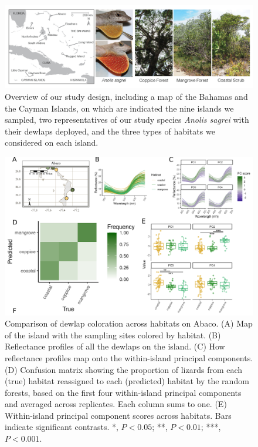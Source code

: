 \begin{figure}[H]
	\centering
	\includegraphics[width=\textwidth]{figures/overview.png}
	\caption{Overview of our study design, including a map of the Bahamas and the Cayman Islands, on which are indicated the nine islands we sampled, two representatives of our study species \textit{Anolis sagrei} with their dewlaps deployed, and the three types of habitats we considered on each island.}
	\label{fig:overview}
\end{figure}

\pagebreak

\begin{figure}[H]
	\centering
	\includegraphics[width=\textwidth]{figures/Abaco.png}
	\caption{Comparison of dewlap coloration across habitats on Abaco. (A) Map of the island with the sampling sites colored by habitat. (B) Reflectance profiles of all the dewlaps on the island. (C) How reflectance profiles map onto the within-island principal components. (D) Confusion matrix showing the proportion of lizards from each (true) habitat reassigned to each (predicted) habitat by the random forests, based on the first four within-island principal components and averaged across replicates. Each column sums to one. (E) Within-island principal component scores across habitats. Bars indicate significant contrasts. *, $P < 0.05$; **, $P < 0.01$; ***, $P < 0.001$.}
	\label{fig:Abaco}
\end{figure}